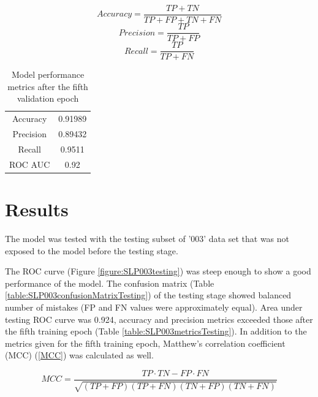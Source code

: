 \documentclass[12pt]{article}
\begin{document}
	\begin{equation}
		Accuracy = \frac{TP+TN}{TP+FP+TN+FN} 
		\label{accuracy}
	\end{equation}
	\begin{equation}
		Precision = \frac{TP}{TP+FP} 
		\label{precision}
	\end{equation}
	\begin{equation}
		Recall = \frac{TP}{TP+FN} 
		\label{recall}
	\end{equation}

	\begin{table}[h!]
		\caption{Model performance metrics after the fifth validation epoch}
		\vspace{0.2cm}
		\centering
		\begin{tabular}{ | c | c | }
			\hline 
			Accuracy & 0.91989 \\
			Precision & 0.89432 \\
			Recall & 0.9511 \\  
			ROC AUC & 0.92 \\
			\hline 
		\end{tabular}
		\label{table:SLP003metricsValidation4}
	\end{table}

	\section{Results}

	The model was tested with the testing subset of '003' data set that was
	not exposed to the model before the testing stage. 

	The ROC curve (Figure \ref{figure:SLP003testing}) was steep enough to show
	a good performance of the model. The confusion matrix 
	(Table \ref{table:SLP003confusionMatrixTesting}) of the testing stage 
	showed balanced number of mistakes (FP and FN values were approximately 
	equal). Area under testing ROC curve was 0.924, 
	accuracy and precision metrics exceeded those after the fifth training 
	epoch (Table \ref{table:SLP003metricsTesting}). In addition to the metrics
	given for the fifth training epoch, Matthew's correlation coefficient (MCC)
	(\ref{MCC}) was calculated as well.

	\begin{equation}
		\label{MCC}
		MCC = \frac{TP \cdot TN - FP \cdot FN}{\sqrt{(TP+FP)(TP+FN)(TN+FP)(TN+FN)}} 
	\end{equation}
\end{document}
